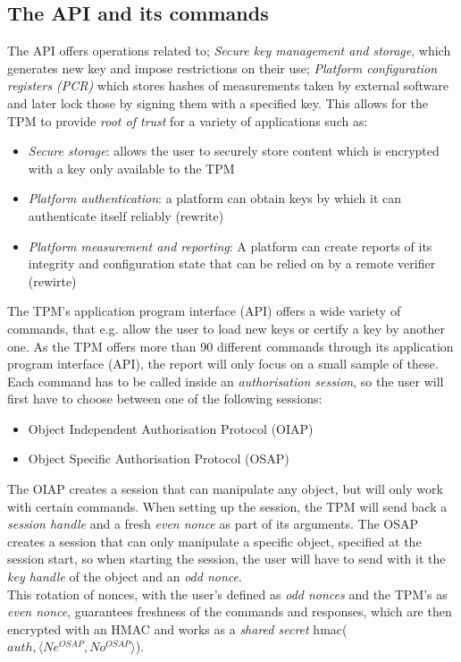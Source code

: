 \subsection{The API and its commands}
The API offers operations related to; \textit{Secure key management and storage}, which generates new key and impose restrictions on their use; \textit{Platform configuration registers (PCR)} which stores hashes of measurements taken by external software and later lock those by signing them with a specified key. This allows for the TPM to provide \textit{root of trust} for a variety of applications such as:
\begin{itemize}
	\item \textit{Secure storage}: allows the user to securely store content which is encrypted with a key only available to the TPM
	\item \textit{Platform authentication}: a platform can obtain keys by which it can authenticate itself reliably (rewrite)
	\item \textit{Platform measurement and reporting}: A platform can create reports of its integrity and configuration state that can be relied on by a remote verifier (rewirte)
\end{itemize}
The TPM's application program interface (API) offers a wide variety of commands, that e.g. allow the user to load new keys or certify a key by another one. As the TPM offers more than 90 different commands through its application program interface (API), the report will only focus on a small sample of these. Each command has to be called inside an \textit{authorisation session}, so the user will first have to choose between one of the following sessions:
\begin{itemize}
  \item Object Independent Authorisation Protocol (OIAP)
  \item Object Specific Authorisation Protocol (OSAP)
\end{itemize}
The OIAP creates a session that can manipulate any object, but will only work with certain commands. When setting up the session, the TPM will send back a \textit{session handle} and a fresh \textit{even nonce} as part of its arguments. 
The OSAP creates a session that can only manipulate a specific object, specified at the session start, so when starting the session, the user will have to send with it the \textit{key handle} of the object and an \textit{odd nonce}. \\
This rotation of nonces, with the user's defined as \textit{odd nonces} and the TPM's as \textit{even nonce}, guarantees freshness of the commands and responses, which are then encrypted with an HMAC and works as a \textit{shared secret} hmac($auth, \langle Ne^{OSAP}, No^{OSAP} \rangle $). \\ \\

